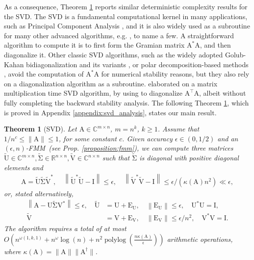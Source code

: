 \documentclass{article}
\newcommand{\lnorm}{\left\|}
\newcommand{\rnorm}{\right\|}
\newcommand{\lpar}{\left(}
\newcommand{\rpar}{\right)}
\newtheorem{theorem}{Theorem}[section]
\DeclareMathOperator{\polylog}{polylog}
\newcommand\matA{\boldsymbol{\mathrm{A}}}
\newcommand\matE{\boldsymbol{\mathrm{E}}}
\newcommand\matI{\boldsymbol{\mathrm{I}}}
\newcommand\matU{\boldsymbol{\mathrm{U}}}
\newcommand\matV{\boldsymbol{\mathrm{V}}}
\newcommand\matUtilde{\widetilde{\boldsymbol{\mathrm{U}}}}
\newcommand\matVtilde{\widetilde{\boldsymbol{\mathrm{V}}}}
\newcommand\matSigmatilde{\widetilde{\boldsymbol{\mathrm{\Sigma}}}}
\newcommand{\fmmalgo}{FMM} \usepackage[utf8]{inputenc}
\begin{document}
As a consequence, Theorem \ref{theorem:svd} reports similar deterministic complexity results for the SVD. The SVD is a fundamental computational kernel in many applications, such as Principal Component Analysis \cite{jolliffe2002principal}, and it is also widely used as a subroutine for many other advanced algorithms, e.g. \cite{papadimitriou1998latent,frieze2004fast,drineas2008relative,boutsidis2014optimal,boutsidis2014randomized,cohen2015dimensionality,boutsidis2016optimal,clarkson2017low}, to name a few. A straightforward algorithm to compute it is to first form the Gramian matrix $\matA^*\matA$, and then diagonalize it. Other classic SVD algorithms, such as the widely adopted Golub-Kahan bidiagonalization and its variants \cite{golub1965calculating}, or polar decomposition-based methods \cite{nakatsukasa2013stable,nakatsukasa2010optimizing}, avoid the computation of $\matA^*\matA$ for numerical stability reasons, but they also rely on a diagonalization algorithm as a subroutine.  
\cite{kacham2024faster} elaborated on a matrix multiplication time SVD algorithm, by using \cite{banks2022pseudospectral} to diagonalize $\matA^\top \matA$, albeit without fully completing the backward stability analysis. 
The following Theorem \ref{theorem:svd}, which is proved in Appendix \ref{appendix:svd_analysis}, states our main result. 

\begin{theorem}[SVD]
    \label{theorem:svd}
    Let $\matA\in\mathbb{C}^{m\times n}$, $m=n^k$, $k\geq 1$. Assume that $1/n^c\leq \|\matA\|\leq 1$, for some constant $c$. Given accuracy $\epsilon\in(0,1/2)$ and an $(\epsilon,n)$-\fmmalgo\   (see Prop. \ref{proposition:fmm}), we can compute three matrices $\matUtilde\in\mathbb{C}^{m\times n},\matSigmatilde\in\mathbb{R}^{n\times n},\matVtilde\in\mathbb{C}^{n\times n}$ such that $\matSigmatilde$ is diagonal with positive diagonal elements and
    \begin{align*}
        \matA=\matUtilde\matSigmatilde\matVtilde^*,
        \quad
        \lnorm \matUtilde^* \matUtilde - \matI \rnorm \leq \epsilon,
        \quad
        \lnorm \matVtilde^* \matVtilde - \matI \rnorm \leq \epsilon/(\kappa(\matA)n^2)\ll \epsilon,
    \end{align*}
    or, stated alternatively,
    \begin{align*}
        \lnorm \matA-\matU\matSigmatilde\matV^*\rnorm \leq \epsilon,
        \quad
        \matUtilde&=\matU+\matE_{\matU},
        \quad
        \lnorm \matE_{\matU }\rnorm \leq \epsilon,
        \quad
        \matU^*\matU=\matI,
        \\
        \matVtilde&=\matV+\matE_{\matV},
        \quad
        \lnorm \matE_{\matV}\rnorm \leq \epsilon/n^2,
        \quad
        \matV^*\matV=\matI.
    \end{align*}
    The algorithm requires a total of at most $O\lpar n^{\omega(1,k,1)} + n^\omega\log(n)+ n^2\polylog(\tfrac{n\kappa(\matA)}{\epsilon})\rpar$ arithmetic operations, where $\kappa(\matA)=\|\matA\|\|\matA^\dagger\|$.
\end{theorem}
\end{document}
